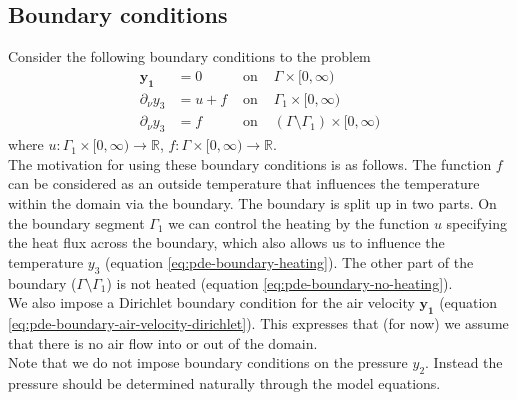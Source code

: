 \documentclass[
12pt,
a4paper,
onecolumn,
portrait
]{article}
\begin{document}
\subsection{Boundary conditions}
Consider the following boundary conditions to the problem
\begin{align}
\mathbf{y_1} &= 0 &\text{ on } &\Gamma \times [0, \infty) \label{eq:pde-boundary-air-velocity-dirichlet} \\
\partial_{\nu} y_3 &= u + f &\text{ on } &\Gamma_1  \times [0, \infty) \label{eq:pde-boundary-heating}\\
\partial_{\nu} y_3 &= f &\text{ on } &(\Gamma \setminus \Gamma_1)  \times [0, \infty) \label{eq:pde-boundary-no-heating}
\end{align}
where $u: \Gamma_1 \times [0, \infty) \rightarrow \mathbb{R}$, $f: \Gamma \times [0, \infty) \rightarrow \mathbb{R}$. \\
The motivation for using these boundary conditions is as follows. The function $f$ can be considered as an outside temperature that influences the temperature within the domain via the boundary. The boundary is split up in two parts. On the boundary segment $\Gamma_1$ we can control the heating by the function $u$ specifying the heat flux across the boundary, which also allows us to influence the temperature $y_3$ (equation \eqref{eq:pde-boundary-heating}). The other part of the boundary ($\Gamma \setminus \Gamma_1$) is not heated (equation \eqref{eq:pde-boundary-no-heating}). \\
We also impose a Dirichlet boundary condition for the air velocity $\mathbf{y_1}$ (equation \eqref{eq:pde-boundary-air-velocity-dirichlet}). This expresses that (for now) we assume that there is no air flow into or out of the domain. \\
Note that we do not impose boundary conditions on the pressure $y_2$. Instead the pressure should be determined naturally through the model equations.
\end{document}
